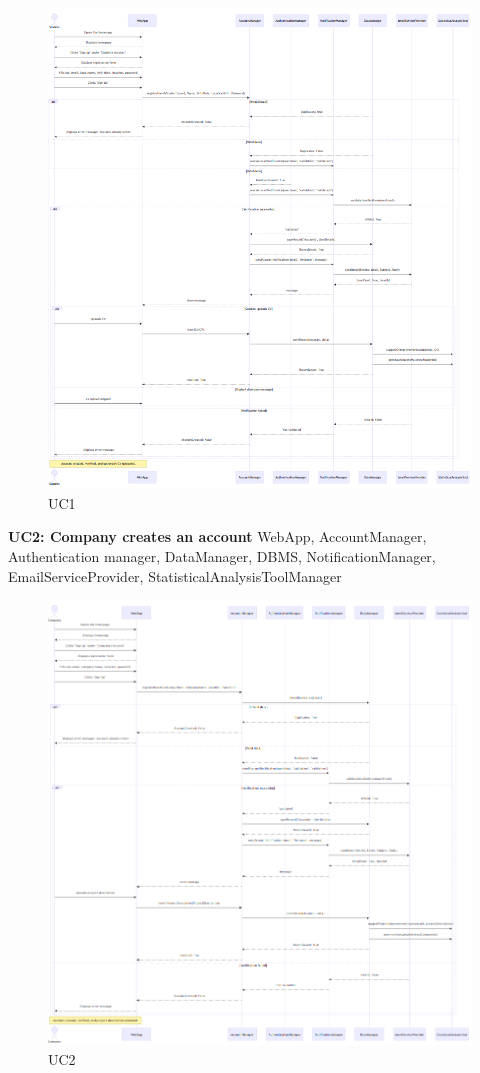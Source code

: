 \begin{figure}[H]
    \centering
    \includegraphics[width=1\linewidth]{DD//Images/SequenceDiagrams/UC1.png}
    \caption{UC1}
\end{figure}

\textbf{UC2: Company creates an account}
WebApp, AccountManager, Authentication manager, DataManager, DBMS, NotificationManager, EmailServiceProvider, StatisticalAnalysisToolManager

\begin{figure}[H]
    \centering
    \includegraphics[width=1\linewidth]{DD//Images/SequenceDiagrams/UC2.png}
    \caption{UC2}
\end{figure}

